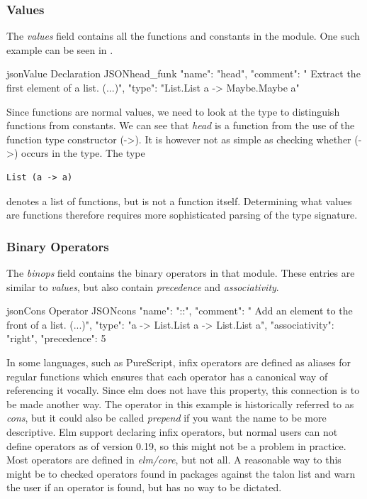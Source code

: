 \documentclass[../thesis.tex]{subfiles}
\begin{document}
\subsubsection{Values}\label{values}
The \textit{values} field contains all the functions and constants in the module.
One such example can be seen in .
\begin{code}{json}{Value Declaration JSON}{head_funk}
{
  "name": "head",
  "comment": " Extract the first element of a list. (...)",
  "type": "List.List a -> Maybe.Maybe a"
}
\end{code}
Since functions are normal values, we need to look at the type to distinguish functions from constants.
We can see that \textit{head} is a function from the use of the function type constructor (->).
It is however not as simple as checking whether (->) occurs in the type.
The type
\begin{verbatim}
List (a -> a)
\end{verbatim}
denotes a list of functions, but is not a function itself.
Determining what values are functions therefore requires more sophisticated parsing of the type signature.

\subsubsection{Binary Operators}\label{binary_operators}
The \textit{binops} field contains the binary operators in that module.
These entries are similar to \textit{values}, but also contain \textit{precedence} and \textit{associativity}.
\begin{code}{json}{Cons Operator JSON}{cons}
{
  "name": "::",
  "comment": " Add an element to the front of a list. (...)",
  "type": "a -> List.List a -> List.List a",
  "associativity": "right",
  "precedence": 5
}
\end{code}
In some languages, such as PureScript, infix operators are defined as aliases
for regular functions which ensures that each operator has a canonical way of referencing it vocally.
Since elm does not have this property, this connection is to be made another way.
The operator in this example is historically referred to as \textit{cons}, but it could also be called
\textit{prepend} if you want the name to be more descriptive.
Elm support declaring infix operators, but normal users can not define operators as of version 0.19, so this might not be a problem in practice.
Most operators are defined in \textit{elm/core}, but not all.%
A reasonable way to this might be to checked operators found in packages against the talon list
and warn the user if an operator is found, but has no way to be dictated.
\end{document}
